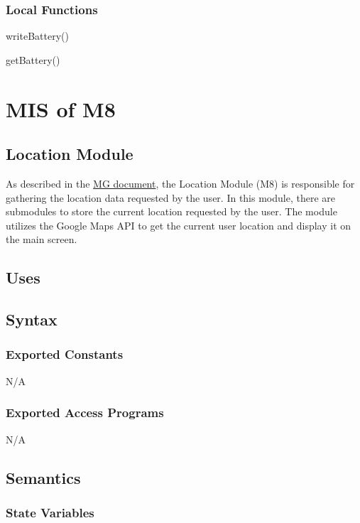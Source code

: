 \documentclass[12pt, titlepage]{article}
\begin{document}
\subsubsection{Local Functions}

\item writeBattery()
\item getBattery()


\section{MIS of M8} \label{Location} 

\subsection{Location Module}

As described in the \href{https://github.com/NevoAbigail/Capstone/blob/main/docs/Design/SoftArchitecture/MG.pdf}{MG document}, the Location Module (M8) is responsible for gathering the location data requested by the user. In this module, there are submodules to store the current location requested by the user. The module utilizes the Google Maps API to get the current user location and display it on the main screen. 

\subsection{Uses}


\subsection{Syntax}

\subsubsection{Exported Constants}

N/A

\subsubsection{Exported Access Programs}

N/A

\subsection{Semantics}

\subsubsection{State Variables}
\end{document}
